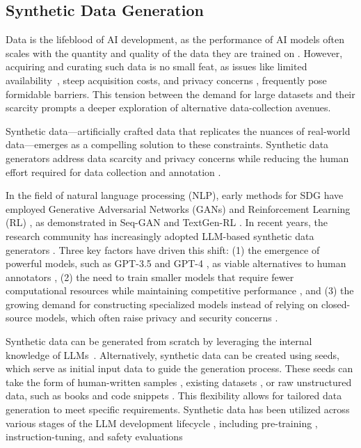 \documentclass[12pt,a4paper]{article}
\begin{document}
\subsection{Synthetic Data Generation}
Data is the lifeblood of AI development, as the performance of AI models often scales with the quantity and quality of the data they are trained on \cite{r110,r111}. However, acquiring and curating such data is no small feat, as issues like limited availability~\cite{r100,r101}, steep acquisition costs, and privacy concerns \cite{r102}, frequently pose formidable barriers. This tension between the demand for large datasets and their scarcity prompts a deeper exploration of alternative data-collection avenues. 

Synthetic data—artificially crafted data that replicates the nuances of real-world data\cite{r103}—emerges as a compelling solution to these constraints. Synthetic data generators address data scarcity and privacy concerns while reducing the human effort required for data collection and annotation \cite{r12,r82,r29,r112}. 

In the field of natural language processing (NLP), early methods for SDG have employed Generative Adversarial Networks (GANs) \cite{goodfellow2014generative} and Reinforcement Learning (RL) \cite{sutton2018reinforcement}, as demonstrated in Seq-GAN \cite{SeqGan} and TextGen-RL \cite{TextGen-RL}. In recent years, the research community has increasingly adopted LLM-based synthetic data generators \cite{r2,r3,r10}. Three key factors have driven this shift: (1) the emergence of powerful models, such as GPT-3.5 \cite{gpt-3.5} and GPT-4 \cite{gpt-4}, as viable alternatives to human annotators \cite{r18}, (2) the need to train smaller models that require fewer computational resources while maintaining competitive performance \cite{r25,r26,r48}, and (3) the growing demand for constructing specialized models instead of relying on closed-source models, which often raise privacy and security concerns \cite{r70}.

Synthetic data can be generated from scratch by leveraging the internal knowledge of LLMs~\cite{r56,r40,r25}. Alternatively, synthetic data can be created using seeds, which serve as initial input data to guide the generation process. These seeds can take the form of human-written samples \cite{r36,r72}, existing datasets \cite{r11,r31}, or raw unstructured data, such as books \cite{r106} and code snippets \cite{r4}.  This flexibility allows for tailored data generation to meet specific requirements.
Synthetic data has been utilized across various stages of the LLM development lifecycle \cite{r10}, including pre-training \cite{r104,r26}, instruction-tuning\cite{r58,r72}, and safety evaluations \cite{zhang-etal-2024-safetybench,guo-etal-2024-controllable}
\end{document}
